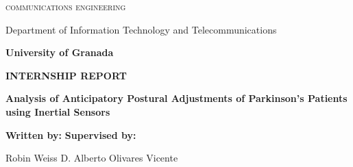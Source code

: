\begin{titlepage}
\label{ch:titlepage}
\begin{center}

{\Large\textsc{communications engineering}}

Department of Information Technology and Telecommunications

\textbf{University of Granada}

\vspace{0.5cm}

\begin{figure}[h]
	\centering
	\label{fig:ugr}
\end{figure}

\vspace{0.5cm}
\textbf{INTERNSHIP REPORT}

\vspace{0.9cm}

{\Huge\textbf{Analysis of Anticipatory Postural Adjustments of Parkinson's Patients using Inertial Sensors}}

\end{center}

\vspace{1.5cm}
\textbf{Written by:}  \hfill \textbf{Supervised by:}

Robin Weiss \hfill D. Alberto Olivares Vicente

\end{titlepage}
